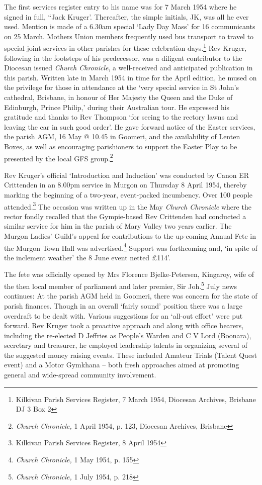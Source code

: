 The first services register entry to his name was for 7 March 1954 where
he signed in full, ``Jack Kruger'. Thereafter, the simple initials, JK,
was all he ever used. Mention is made of a 6.30am special `Lady Day
Mass' for 16 communicants on 25 March. Mothers Union members frequently
used bus transport to travel to special joint services in other parishes
for these celebration days.\footnote{Kilkivan Parish Services Register,
  7 March 1954, Diocesan Archives, Brisbane DJ 3 Box 2} Rev Kruger,
following in the footsteps of his predecessor, was a diligent
contributor to the Diocesan issued \emph{Church Chronicle}, a
well-received and anticipated publication in this parish. Written late
in March 1954 in time for the April edition, he mused on the privilege
for those in attendance at the `very special service in St John's
cathedral, Brisbane, in honour of Her Majesty the Queen and the Duke of
Edinburgh, Prince Philip,' during their Australian tour. He expressed
his gratitude and thanks to Rev Thompson `for seeing to the rectory
lawns and leaving the car in such good order'. He gave forward notice of
the Easter services, the parish AGM, 16 May @ 10.45 in Goomeri, and the
availability of Lenten Boxes, as well as encouraging parishioners to
support the Easter Play to be presented by the local GFS
group.\footnote{\emph{Church Chronicle,} 1 April 1954, p. 123, Diocesan
  Archives, Brisbane}

Rev Kruger's official `Introduction and Induction' was conducted by
Canon ER Crittenden in an 8.00pm service in Murgon on Thursday 8 April
1954, thereby marking the beginning of a two-year, event-packed
incumbency. Over 100 people attended.\footnote{Kilkivan Parish Services
  Register, 8 April 1954} The occasion was written up in the May
\emph{Church Chronicle} where the rector fondly recalled that the
Gympie-based Rev Crittenden had conducted a similar service for him in
the parish of Mary Valley two years earlier. The Murgon Ladies' Guild's
appeal for contributions to the up-coming Annual Fete in the Murgon Town
Hall was advertised.\footnote{\emph{Church Chronicle,} 1 May 1954, p.
  155} Support was forthcoming and, `in spite of the inclement weather'
the 8 June event netted \pounds114'.

The fete was officially opened by Mrs Florence Bjelke-Petersen,
Kingaroy, wife of the then local member of parliament and later premier,
Sir Joh.\footnote{\emph{Church Chronicle,} 1 July 1954, p. 218} July
news continues: At the parish AGM held in Goomeri, there was concern for
the state of parish finances. Though in an overall `fairly sound'
position there was a large overdraft to be dealt with. Various
suggestions for an `all-out effort' were put forward. Rev Kruger took a
proactive approach and along with office bearers, including the
re-elected D Jeffries as People's Warden and C V Lord (Boonara),
secretary and treasurer, he employed leadership talents in organizing
several of the suggested money raising events. These included Amateur
Trials (Talent Quest event) and a Motor Gymkhana -- both fresh
approaches aimed at promoting general and wide-spread community
involvement.

